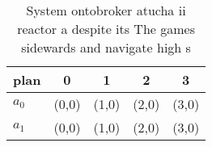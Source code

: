 \documentclass[a4paper]{article}
\begin{document}
\begin{table}
\begin{adjustbox}{width=0.5\columnwidth}
\begin{tabular}{|l|l|l|l|l|}
\hline
\textbf{plan} & \multicolumn{1}{c|}{\textbf{0}} & \multicolumn{1}{c|}{\textbf{1}} & \multicolumn{1}{c|}{\textbf{2}} & \multicolumn{1}{c|}{\textbf{3}} \\ \hline
\textbf{$a_0$}  & (0,0) & (1,0) & (2,0) & (3,0) \\ \hline
\textbf{$a_1$}  & (0,0) & (1,0) & (2,0) & (3,0) \\ \hline
\end{tabular}
\end{adjustbox}
\caption{System ontobroker atucha ii reactor a despite its The games sidewards and navigate high s
}
\end{table}
\end{document}
